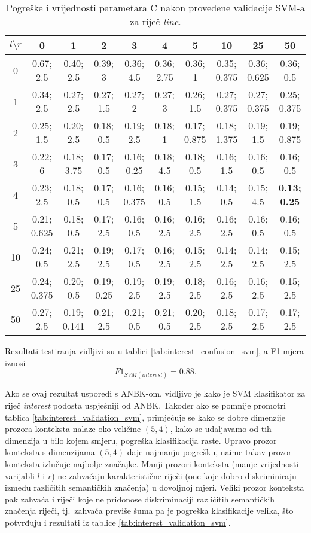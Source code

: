\documentclass[10pt, a4paper]{article}
\begin{document}
\begin{table*}[!hbtp]
\caption{Pogreške i vrijednosti parametara C nakon provedene validacije SVM-a za riječ \emph{line}.}
\label{tab:line_validation_svm}
\begin{center}
\begin{tabular}{|c|ccccccccc|}
\hline
$l \setminus r$ & 0 & 1 & 2 & 3 & 4 & 5 & 10 & 25 & 50 \\
\hline
0 & 0.67; 2.5 & 0.40; 2.5 & 0.39; 3 & 0.36; 4.5 & 0.36; 2.75 & 0.36; 1 & 0.35; 0.375 & 0.36; 0.625 & 0.36; 0.5 \\
1 & 0.34; 2.5 & 0.27; 2.5 & 0.27; 1.5 & 0.27; 2 & 0.27; 3 & 0.26; 1.5 & 0.27; 0.375 & 0.27; 0.375 & 0.25; 0.375 \\
2 & 0.25; 1.5 & 0.20; 2.5 & 0.18; 0.5 & 0.19; 2.5 & 0.18; 1 & 0.17; 0.875 & 0.18; 1.375 & 0.19; 1.5 & 0.19; 0.875 \\
3 & 0.22; 6 & 0.18; 3.75 & 0.17; 0.5 & 0.16; 0.25 & 0.18; 4.5 & 0.18; 0.5 & 0.16; 1.5 & 0.16; 0.5 & 0.16; 0.5 \\
4 & 0.23; 2.5 & 0.18; 0.5 & 0.17; 0.5 & 0.16; 0.375 & 0.16; 0.5 & 0.15; 1.5 & 0.14; 0.5 & 0.15; 4.5 & \textbf{0.13; 0.25} \\
5 & 0.21; 0.625 & 0.18; 0.5 & 0.17; 2.5 & 0.16; 0.5 & 0.16; 2.5 & 0.16; 2.5 & 0.16; 2.5 & 0.16; 0.5 & 0.16; 0.5 \\
10 & 0.24; 0.5 & 0.21; 2.5 & 0.19; 2.5 & 0.17; 0.5 & 0.16; 2.5 & 0.15; 2.5 & 0.14; 2.5 & 0.14; 2.5 & 0.15; 2.5 \\
25 & 0.24; 0.375 & 0.20; 0.5 & 0.19; 0.25 & 0.19; 2.5 & 0.19; 2.5 & 0.18; 2.5 & 0.16; 2.5 & 0.16; 2.5 & 0.15; 2.5 \\
50 & 0.27; 2.5 & 0.19; 0.141 & 0.21; 2.5 & 0.21; 0.5 & 0.21; 0.5 & 0.20; 2.5 & 0.18; 2.5 & 0.17; 2.5 & 0.17; 2.5 \\
\hline
\end{tabular}
\end{center}
\end{table*}
Rezultati testiranja vidljivi su u tablici \ref{tab:interest_confusion_svm},
a F1 mjera iznosi
\begin{equation}
\label{eq:f1_svm_interest}
F1_{SVM(interest)} = 0.88.
\end{equation}

Ako se ovaj rezultat usporedi s ANBK-om, vidljivo je kako je SVM klasifikator za riječ \emph{interest} podosta uspješniji od ANBK.
Također ako se pomnije promotri tablica \ref{tab:interest_validation_svm}, primjećuje se kako se dobre dimenzije
prozora konteksta nalaze oko veličine $(5,4)$, 
kako se udaljavamo od tih dimenzija u bilo kojem smjeru, pogreška klasifikacija raste.
Upravo prozor konteksta s dimenzijama $(5, 4)$ daje najmanju pogrešku,
naime takav prozor konteksta izlučuje najbolje značajke.
Manji prozori konteksta (manje vrijednosti varijabli $l$ i $r$) 
ne zahvaćaju karakteristične riječi (one koje dobro diskriminiraju između različitih semantičkih značenja) u dovoljnoj mjeri.
Veliki prozor konteksta pak zahvaća i riječi koje ne pridonose diskriminaciji
različitih semantičkih značenja riječi, tj.~zahvaća previše šuma pa je
pogreška klasifikacije velika, što potvrđuju i rezultati iz tablice \ref{tab:interest_validation_svm}.
\end{document}
